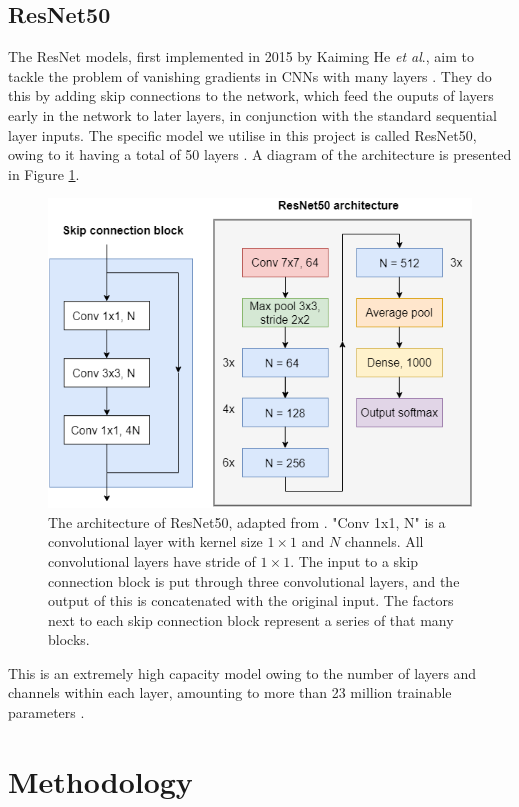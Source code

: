 \documentclass[12pt]{article}
\begin{document}
\subsection{ResNet50}
The ResNet models, first implemented in 2015 by Kaiming He \textit{et al}., aim to tackle the problem of vanishing gradients in CNNs with many layers \cite{He15}. They do this by adding skip connections to the network, which feed the ouputs of layers early in the network to later layers, in conjunction with the standard sequential layer inputs. The specific model we utilise in this project is called ResNet50, owing to it having a total of 50 layers \cite{He15}. A diagram of the architecture is presented in Figure \ref{resnet50}.
\begin{figure}[!h]
\centering
\includegraphics[width=4.5in]{images/resnet50.png}
\caption{The architecture of ResNet50, adapted from \cite{He15}. "Conv 1x1, N" is a convolutional layer with kernel size $1\times1$ and $N$ channels. All convolutional layers have stride of $1\times1$. The input to a skip connection block is put through three convolutional layers, and the output of this is concatenated with the original input. The factors next to each skip connection block represent a series of that many blocks.}
\label{resnet50}
\end{figure}
This is an extremely high capacity model owing to the number of layers and channels within each layer, amounting to more than 23 million trainable parameters \cite{He15}.

\section{Methodology}
\end{document}
